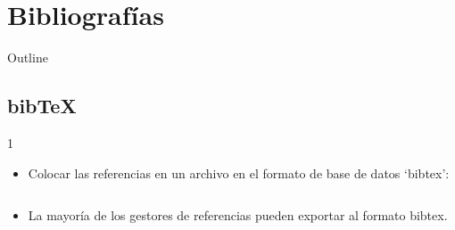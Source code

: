 \documentclass{beamer}
\begin{document}
\section{Bibliografías}

\begin{frame}{Outline}
  \begin{multicols}{2}
    \tableofcontents[currentsection]
  \end{multicols}
\end{frame}

\subsection{bib\TeX}
\begin{frame}[fragile]{\insertsubsection{} 1}
  \begin{itemize}
  \item Colocar las referencias en un archivo  en el
    formato de base de datos  `bibtex':
    \inputminted[fontsize=\scriptsize,frame=single]{latex}{bib-example.bib}
  \item La mayoría de los gestores de referencias pueden exportar al
    formato bibtex.
  \end{itemize}
\end{frame}
\end{document}
